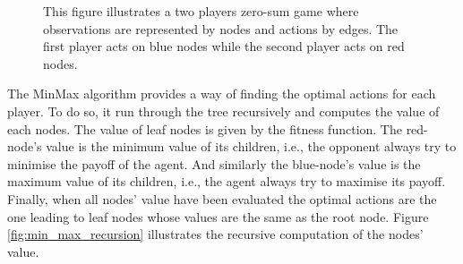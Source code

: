 \documentclass[11pt,fleqn]{book} %
\begin{document}
{
\renewcommand\fbox{\fcolorbox{white}{white}}
\begin{figure}[H]
	\begin{center}
 	\end{center}
\vspace{-0.25cm}
    \caption{
This figure illustrates a two players zero-sum game where observations are represented by nodes and actions by edges. The first player acts on blue nodes while the second player acts on red nodes.}
    \label{fig:min_max_tree}
\end{figure}
}

The MinMax algorithm provides a way of finding the optimal actions for each player. To do so, it run through the tree recursively and computes the value of each nodes. The value of leaf nodes is given by the fitness function. The red-node's value is the minimum value of its children, i.e., the opponent always try to minimise the payoff of the agent. And similarly the blue-node's value is the maximum value of its children, i.e., the agent always try to maximise its payoff. Finally, when all nodes' value have been evaluated the optimal actions are the one leading to leaf nodes whose values are the same as the root node. Figure \ref{fig:min_max_recursion} illustrates the recursive computation of the nodes' value.
\end{document}
